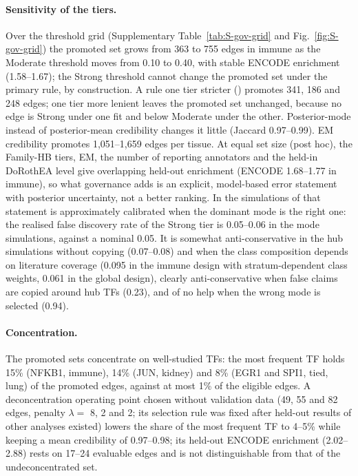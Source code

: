 \documentclass[11pt,a4paper]{article}
\begin{document}
\paragraph{Sensitivity of the tiers.}
Over the threshold grid (Supplementary Table~\ref{tab:S-gov-grid} and Fig.~\ref{fig:S-gov-grid}) the promoted set grows from 363 to 755 edges in immune as the Moderate threshold moves from 0.10 to 0.40, with stable ENCODE enrichment (1.58--1.67); the Strong threshold cannot change the promoted set under the primary rule, by construction.
A rule one tier stricter () promotes 341, 186 and 248 edges; one tier more lenient leaves the promoted set unchanged, because no edge is Strong under one fit and below Moderate under the other.
Posterior-mode instead of posterior-mean credibility changes it little (Jaccard 0.97--0.99).
EM credibility promotes 1{,}051--1{,}659 edges per tissue.
At equal set size (post hoc), the Family-HB tiers, EM, the number of reporting annotators and the held-in DoRothEA level give overlapping held-out enrichment (ENCODE 1.68--1.77 in immune), so what governance adds is an explicit, model-based error statement with posterior uncertainty, not a better ranking.
In the simulations of  that statement is approximately calibrated when the dominant mode is the right one: the realised false discovery rate of the Strong tier is 0.05--0.06 in the mode simulations, against a nominal 0.05.
It is somewhat anti-conservative in the hub simulations without copying (0.07--0.08) and when the class composition depends on literature coverage (0.095 in the immune design with stratum-dependent class weights, 0.061 in the global design), clearly anti-conservative when false claims are copied around hub TFs (0.23), and of no help when the wrong mode is selected (0.94).

\paragraph{Concentration.}
The promoted sets concentrate on well-studied TFs: the most frequent TF holds 15\% (NFKB1, immune), 14\% (JUN, kidney) and 8\% (EGR1 and SPI1, tied, lung) of the promoted edges, against at most 1\% of the eligible edges.
A deconcentration operating point chosen without validation data (49, 55 and 82 edges, penalty $\lambda=$ 8, 2 and 2; its selection rule was fixed after held-out results of other analyses existed) lowers the share of the most frequent TF to 4--5\% while keeping a mean credibility of 0.97--0.98; its held-out ENCODE enrichment (2.02--2.88) rests on 17--24 evaluable edges and is not distinguishable from that of the undeconcentrated set.
\end{document}
